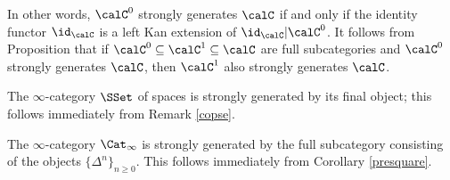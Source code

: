 \begin{remark}\label{sobre}
In other words, $\calC^0$ strongly generates $\calC$ if and only if the identity functor
$\id_{\calC}$ is a left Kan extension of $\id_{\calC} | \calC^{0}$. It follows from Proposition  that if $\calC^{0} \subseteq \calC^{1} \subseteq \calC$ are full subcategories and
$\calC^{0}$ strongly generates $\calC$, then $\calC^{1}$ also strongly generates $\calC$.
\end{remark}

\begin{example}
The $\infty$-category $\SSet$ of spaces is strongly generated by its final object;
this follows immediately from Remark \ref{copse}.
\end{example}

\begin{example}\label{upsquare}
The $\infty$-category $\Cat_{\infty}$ is strongly generated by the full subcategory consisting of the objects $\{ \Delta^n \}_{n \geq 0}$. This follows immediately from Corollary \ref{presquare}.
\end{example}


